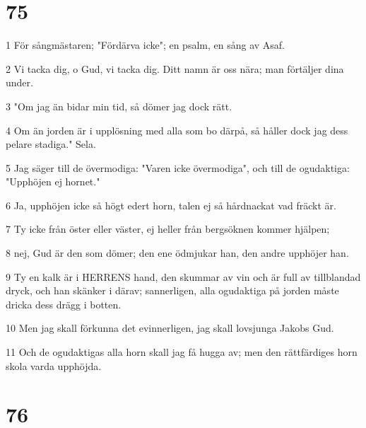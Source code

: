 \chapter{75}

\par 1 För sångmästaren; "Fördärva icke"; en psalm, en sång av Asaf.
\par 2 Vi tacka dig, o Gud, vi tacka dig. Ditt namn är oss nära; man förtäljer dina under.
\par 3 "Om jag än bidar min tid, så dömer jag dock rätt.
\par 4 Om än jorden är i upplösning med alla som bo därpå, så håller dock jag dess pelare stadiga." Sela.
\par 5 Jag säger till de övermodiga: "Varen icke övermodiga", och till de ogudaktiga: "Upphöjen ej hornet."
\par 6 Ja, upphöjen icke så högt edert horn, talen ej så hårdnackat vad fräckt är.
\par 7 Ty icke från öster eller väster, ej heller från bergsöknen kommer hjälpen;
\par 8 nej, Gud är den som dömer; den ene ödmjukar han, den andre upphöjer han.
\par 9 Ty en kalk är i HERRENS hand, den skummar av vin och är full av tillblandad dryck, och han skänker i därav; sannerligen, alla ogudaktiga på jorden måste dricka dess drägg i botten.
\par 10 Men jag skall förkunna det evinnerligen, jag skall lovsjunga Jakobs Gud.
\par 11 Och de ogudaktigas alla horn skall jag få hugga av; men den rättfärdiges horn skola varda upphöjda.

\chapter{76}

